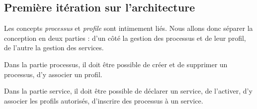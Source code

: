 \documentclass[french, 11pt, a4paper]{article}
\begin{document}
    \subsection{Première itération sur l'architecture}
        Les concepts \emph{processus} et \emph{profile} sont intimement liés.
        Nous allons donc séparer la conception en deux parties : d'un côté la
        gestion des processus et de leur profil, de l'autre la gestion des
        services.

        Dans la partie processus, il doit être possible de créer et de supprimer
        un processus, d'y associer un profil.

        Dans la partie service, il doit être possible de déclarer un service, de
        l'activer, d'y associer les profils autorisés, d'inscrire des processus à un service.
\end{document}
